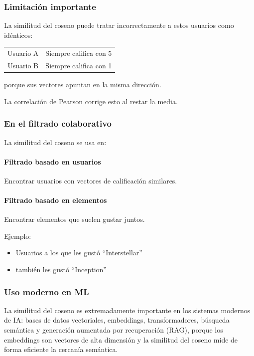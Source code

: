 \documentclass[12pt]{article}
\begin{document}
\subsubsection*{Limitación importante}
La similitud del coseno puede tratar incorrectamente a estos usuarios como idénticos:
\begin{center}
\begin{tabular}{|c|c|}
\hline
Usuario A & Siempre califica con 5 \\
Usuario B & Siempre califica con 1 \\
\hline
\end{tabular}
\end{center}
porque sus vectores apuntan en la misma dirección.

La correlación de Pearson corrige esto al restar la media.

\subsubsection*{En el filtrado colaborativo}
La similitud del coseno se usa en:
\paragraph{Filtrado basado en usuarios} Encontrar usuarios con vectores de calificación similares.

\paragraph{Filtrado basado en elementos} Encontrar elementos que suelen gustar juntos.

Ejemplo:
\begin{itemize}
\item Usuarios a los que les gustó ``Interstellar''
\item también les gustó ``Inception''
\end{itemize}

\subsubsection*{Uso moderno en ML}
La similitud del coseno es extremadamente importante en los sistemas modernos de IA: bases de datos vectoriales, embeddings, transformadores, búsqueda semántica y generación aumentada por recuperación (RAG), porque los embeddings son vectores de alta dimensión y la similitud del coseno mide de forma eficiente la cercanía semántica.
\end{document}
